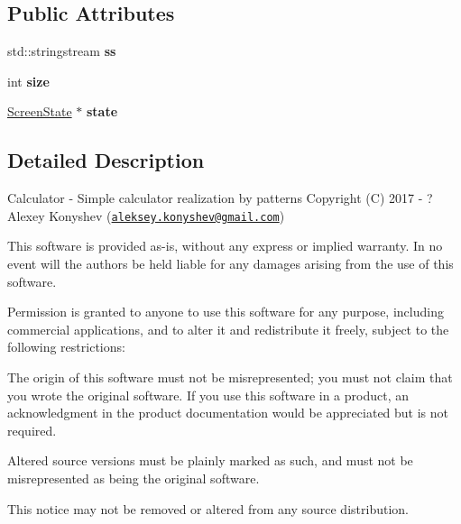 \subsection*{Public Attributes}
\begin{DoxyCompactItemize}
\item 
\hypertarget{class_screen_a027afe6f31862a0a06bd785538f30558}{}std\+::stringstream {\bfseries ss}\label{class_screen_a027afe6f31862a0a06bd785538f30558}

\item 
\hypertarget{class_screen_afc44809d98c65830d23ec33acb1fdb1f}{}int {\bfseries size}\label{class_screen_afc44809d98c65830d23ec33acb1fdb1f}

\item 
\hypertarget{class_screen_a4e6d87519cee816a2b3bff3bf679c714}{}\hyperlink{class_screen_state}{Screen\+State} $\ast$ {\bfseries state}\label{class_screen_a4e6d87519cee816a2b3bff3bf679c714}

\end{DoxyCompactItemize}


\subsection{Detailed Description}
Calculator -\/ Simple calculator realization by patterns Copyright (C) 2017 -\/ ? Alexey Konyshev (\href{mailto:aleksey.konyshev@gmail.com}{\tt aleksey.\+konyshev@gmail.\+com})

This software is provided \textquotesingle{}as-\/is\textquotesingle{}, without any express or implied warranty. In no event will the authors be held liable for any damages arising from the use of this software.

Permission is granted to anyone to use this software for any purpose, including commercial applications, and to alter it and redistribute it freely, subject to the following restrictions\+:


\begin{DoxyEnumerate}
\item The origin of this software must not be misrepresented; you must not claim that you wrote the original software. If you use this software in a product, an acknowledgment in the product documentation would be appreciated but is not required.
\item Altered source versions must be plainly marked as such, and must not be misrepresented as being the original software.
\item This notice may not be removed or altered from any source distribution. 
\end{DoxyEnumerate}

